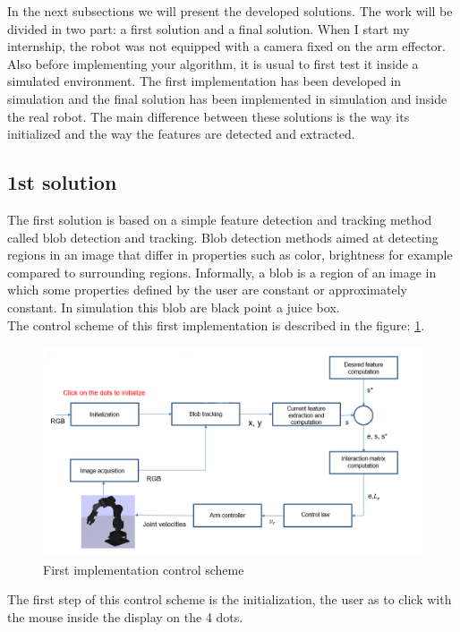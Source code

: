 In the next subsections we will present the developed solutions. The work will be divided in two part: a first solution and a final solution. When I start my internship, the robot was not equipped with a camera fixed on the arm effector. Also before implementing your algorithm, it is usual to first test it inside a simulated environment. The first implementation has been developed in simulation and the final solution has been implemented in simulation and inside the real robot. The main difference between these solutions is the way its initialized and the way the features are detected and extracted.

\subsection{1st solution}
  
The first solution is based on a simple feature detection and tracking method called blob detection and tracking. Blob detection methods aimed at detecting regions in an image that differ in properties such as color, brightness for example compared to surrounding regions. Informally, a blob is a region of an image in which some properties defined by the user are constant or approximately constant. In simulation this blob are black point a juice box.\\
The control scheme of this first implementation is described in the figure: \ref{pict:control_scheme_1}.
\begin{figure} [!h]
    \centering
    \includegraphics[width=1.\linewidth]{images/control_scheme_1.png}
    \caption{First implementation control scheme}
    \label{pict:control_scheme_1}
\end{figure}

The first step of this control scheme is the initialization, the user as to click with the mouse inside the display on the 4 dots. 



